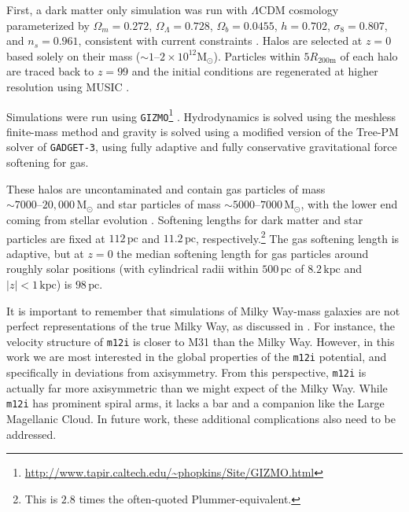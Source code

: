 \documentclass[twocolumn]{aastex62}
\newcommand{\Msun}{\text{M}_\odot}
\newcommand{\pc}{\text{pc}}
\newcommand{\kpc}{\text{kpc}}
\newcommand{\abs}[1]{\left| #1 \right|}
\newcommand{\z}{z}
\begin{document}
First, a dark matter only simulation was run with $\Lambda$CDM cosmology
parameterized by $\Omega_m = 0.272$, $\Omega_{\Lambda} = 0.728$, $\Omega_b =
0.0455$, $h = 0.702$, $\sigma_8 = 0.807$, and $n_s = 0.961$, consistent with
current constraints \citep{2018arXiv180706209P}. Halos are selected at $z=0$
based solely on their mass ($\sim 1\text{--}2 \times 10^{12} \Msun$).
Particles within $5 R_{200\text{m}}$ of each halo are traced back to $\z=99$
and the initial conditions are regenerated at higher resolution using MUSIC
\citep{2011MNRAS.415.2101H}.

Simulations were run using
\texttt{GIZMO}\footnote{\url{http://www.tapir.caltech.edu/~phopkins/Site/GIZMO.html}}
\citep{2015MNRAS.450...53H}. Hydrodynamics is solved using the meshless
finite-mass method and gravity is solved using a modified version of the
Tree-PM solver of \texttt{GADGET-3}, using fully adaptive and fully
conservative gravitational force softening for gas.

These halos are uncontaminated and contain gas particles of mass $\sim 7000
\text{--} 20,000\,\Msun$ and star particles of mass $\sim 5000 \text{--} 7000\,
\Msun$, with the lower end coming from stellar evolution
\citep{2018arXiv180610564S}. Softening lengths for dark matter and star
particles are fixed at $112\,\pc$ and $11.2\,\pc$,
respectively.\footnote{This is $2.8$ times the often-quoted
Plummer-equivalent.} The gas softening length is adaptive, but at $z=0$ the
median softening length for gas particles around roughly solar positions
(with cylindrical radii within $500\,\pc$ of $8.2\,\kpc$ and
$\abs{z}<1\,\kpc$) is $98\,\pc$.


It is important to remember that simulations of Milky Way-mass galaxies are
not perfect representations of the true Milky Way, as discussed in
\citet{2018arXiv180610564S}. For instance, the velocity structure of
\texttt{m12i} is closer to M31 than the Milky Way. However, in this work we
are most interested in the global properties of the \texttt{m12i} potential,
and specifically in deviations from axisymmetry. From this perspective,
\texttt{m12i} is actually far more axisymmetric than we might expect of the
Milky Way. While \texttt{m12i} has prominent spiral arms, it lacks a bar and
a companion like the Large Magellanic Cloud. In future work, these additional
complications also need to be addressed.
\end{document}
